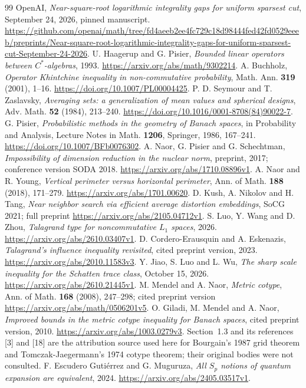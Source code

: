 \documentclass[11pt]{article}
\theoremstyle{remark}\newtheorem{remark}[theorem]{Remark}
\numberwithin{equation}{section}
\begin{document}
\begin{thebibliography}{99}
 OpenAI, \emph{Near-square-root logarithmic integrality gaps
for uniform sparsest cut}, September 24, 2026, pinned manuscript.
\url{https://github.com/openai/math/tree/fd4aeeb2ee4fc729c18d98444fed42fd0529eeeb/preprints/Near-square-root-logarithmic-integrality-gaps-for-uniform-sparsest-cut-September-24-2026}.
 U. Haagerup and G. Pisier, \emph{Bounded linear operators
between $C^*$-algebras}, 1993. \url{https://arxiv.org/abs/math/9302214}.
 A. Buchholz, \emph{Operator Khintchine inequality in
non-commutative probability}, Math. Ann. \textbf{319} (2001), 1--16.
\url{https://doi.org/10.1007/PL00004425}.
 P. D. Seymour and T. Zaslavsky, \emph{Averaging sets:
a generalization of mean values and spherical designs}, Adv. Math.
\textbf{52} (1984), 213--240.
\url{https://doi.org/10.1016/0001-8708(84)90022-7}.
 G. Pisier, \emph{Probabilistic methods in the geometry
of Banach spaces}, in Probability and Analysis, Lecture Notes in Math.
\textbf{1206}, Springer, 1986, 167--241.
\url{https://doi.org/10.1007/BFb0076302}.
 A. Naor, G. Pisier and G. Schechtman, \emph{Impossibility
of dimension reduction in the nuclear norm}, preprint, 2017;
conference version SODA 2018. \url{https://arxiv.org/abs/1710.08896v1}.
 A. Naor and R. Young, \emph{Vertical perimeter versus
horizontal perimeter}, Ann. of Math. \textbf{188} (2018), 171--279.
\url{https://arxiv.org/abs/1701.00620}.
 D. Kush, A. Nikolov and H. Tang, \emph{Near neighbor
search via efficient average distortion embeddings}, SoCG 2021;
full preprint \url{https://arxiv.org/abs/2105.04712v1}.
 S. Luo, Y. Wang and D. Zhou, \emph{Talagrand type for
noncommutative $L_1$ spaces}, 2026.
\url{https://arxiv.org/abs/2610.03407v1}.
 D. Cordero-Erausquin and A. Eskenazis,
\emph{Talagrand's influence inequality revisited}, cited preprint version,
2023. \url{https://arxiv.org/abs/2010.11583v3}.
 Y. Jiao, S. Luo and L. Wu, \emph{The sharp scale inequality
for the Schatten trace class}, October 15, 2026.
\url{https://arxiv.org/abs/2610.21445v1}.
 M. Mendel and A. Naor, \emph{Metric cotype}, Ann. of Math.
\textbf{168} (2008), 247--298; cited preprint version
\url{https://arxiv.org/abs/math/0506201v5}.
 O. Giladi, M. Mendel and A. Naor, \emph{Improved bounds
in the metric cotype inequality for Banach spaces}, cited preprint version,
2010. \url{https://arxiv.org/abs/1003.0279v3}.
Section~1.3 and its references [3] and [18] are the attribution source
used here for Bourgain's 1987 grid theorem and Tomczak-Jaegermann's
1974 cotype theorem; their original bodies were not consulted.
 F. Escudero Guti\'errez and G. Muguruza,
\emph{All $S_p$ notions of quantum expansion are equivalent}, 2024.
\url{https://arxiv.org/abs/2405.03517v1}.
\end{thebibliography}
\end{document}
